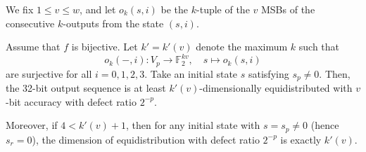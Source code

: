 \documentclass{svmult}
\def\F2{{\mathbb F}_2}
\begin{document}
We fix $1\leq v \leq w$, and let $o_k(s,i)$ be the $k$-tuple
of the $v$ MSBs of the consecutive $k$-outputs from 
the state $(s,i)$.
\begin{proposition}
Assume that $f$ is bijective.
Let $k'=k'(v)$ denote the maximum $k$ 
such that 
\begin{equation}\label{eq:chi-k-i}
o_k(-,i): V_p \to \F2^{kv}, \quad s \mapsto o_k(s,i)
\end{equation}
are surjective for all $i=0,1,2,3$. 
Take an initial state $s$ satisfying $s_p \neq 0$.
Then, the 32-bit output sequence is at least $k'(v)$-dimensionally
equidistributed with $v$-bit accuracy with defect ratio
$2^{-p}$.

Moreover, if $4 < k'(v)+1$, then  
for any initial state with $s=s_p \neq 0$
(hence $s_r=0$), the dimension of equidistribution
with defect ratio $2^{-p}$ is exactly $k'(v)$.
\end{proposition}
\end{document}
